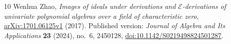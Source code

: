 \documentclass[11pt]{article}
\begin{document}
\begin{thebibliography}{10}
Wenhua Zhao, \emph{Images of ideals under derivations and
$\mathcal E$-derivations of univariate polynomial algebras over a field of
characteristic zero},
\href{https://arxiv.org/abs/1701.06125v1}{arXiv:1701.06125v1} (2017).
Published version: \emph{Journal of Algebra and Its Applications}
\textbf{23} (2024), no.~6, 2450128,
\href{https://doi.org/10.1142/S0219498824501287}{doi:10.1142/S0219498824501287}.
\end{thebibliography}
\end{document}
